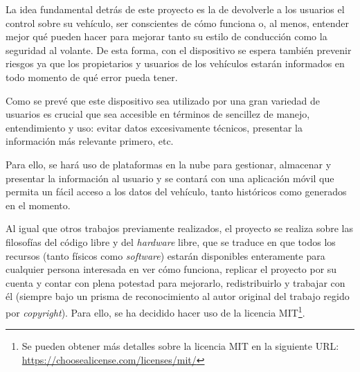 La idea fundamental detrás de este proyecto es la de devolverle a los usuarios
el control sobre su vehículo, ser conscientes de cómo funciona o, al menos, entender
mejor qué pueden hacer para mejorar tanto su estilo de conducción como la seguridad
al volante. De esta forma, con el dispositivo se espera también prevenir riesgos
ya que los propietarios y usuarios de los vehículos estarán informados en todo
momento de qué error pueda tener.

Como se prevé que este dispositivo sea utilizado por una gran variedad de usuarios
es crucial que sea accesible en términos de sencillez de manejo, entendimiento y
uso: evitar datos excesivamente técnicos, presentar la información más relevante
primero, etc.

Para ello, se hará uso de plataformas en la nube para gestionar, almacenar y presentar
la información al usuario y se contará con una aplicación móvil que permita un
fácil acceso a los datos del vehículo, tanto históricos como generados en el momento.

Al igual que otros trabajos previamente realizados, el proyecto se realiza sobre
las filosofías del código libre y del \textit{hardware} libre, que se traduce en
que todos los recursos (tanto físicos como \textit{software}) estarán disponibles
enteramente para cualquier persona interesada en ver cómo funciona, replicar el
proyecto por su cuenta y contar con plena potestad para mejorarlo, redistribuirlo
y trabajar con él (siempre bajo un prisma de reconocimiento al autor original
del trabajo regido por \textit{copyright}). Para ello, se ha decidido hacer uso
de la licencia MIT\footnote{Se pueden obtener más detalles sobre la licencia MIT
en la siguiente URL: \url{https://choosealicense.com/licenses/mit/}}.

